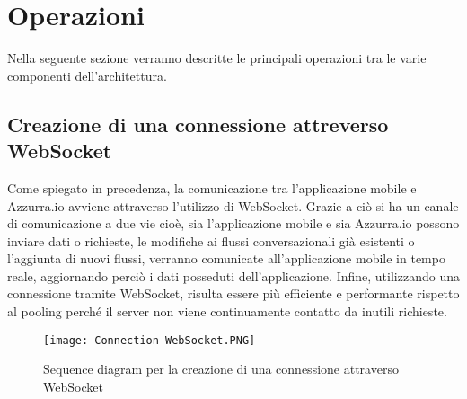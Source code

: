 \section{Operazioni}
Nella seguente sezione verranno descritte le principali operazioni tra le varie componenti dell'architettura.
\subsection{Creazione di una connessione attreverso WebSocket}
Come spiegato in precedenza, la comunicazione tra l'applicazione mobile e Azzurra.io avviene attraverso l'utilizzo di \gls{WebSocket}\ap{[g]}. Grazie a ciò si ha un canale di comunicazione a due vie cioè, sia l'applicazione mobile e sia Azzurra.io possono inviare dati o richieste, le modifiche ai flussi conversazionali già esistenti o l'aggiunta di nuovi flussi, verranno comunicate all'applicazione mobile in tempo reale, aggiornando perciò i dati posseduti dell'applicazione. Infine, utilizzando una connessione tramite \gls{WebSocket}\ap{[g]}, risulta essere più efficiente e performante rispetto al \gls{pooling}\ap{[g]} perché il server non viene continuamente contatto da inutili richieste.
\begin{figure}[h]
	\begin{center}
		\texttt{[image: Connection-WebSocket.PNG]}
		\caption{Sequence diagram per la creazione di una connessione attraverso WebSocket}\label{fig:websocket}
	\end{center}
\end{figure}

